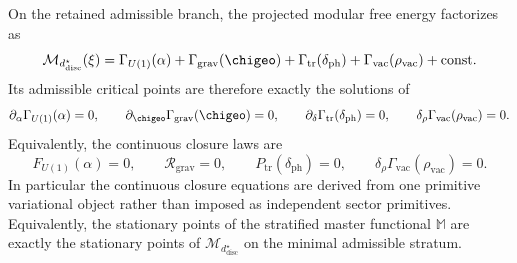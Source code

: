 
\begin{theorem}
\label{thm:continuous-closure-from-master-functional}
On the retained admissible branch, the projected modular free energy factorizes as
\[
\mathcal M_{d^\star_{\mathrm{disc}}}(\xi)
=
\Gamma_{U(1)}(\alpha)
+
\Gamma_{\mathrm{grav}}(\chigeo)
+
\Gamma_{\mathrm{tr}}(\delta_{\mathrm{ph}})
+
\Gamma_{\mathrm{vac}}(\rho_{\mathrm{vac}})
+\mathrm{const}.
\]
Its admissible critical points are therefore exactly the solutions of
\[
\partial_\alpha\Gamma_{U(1)}(\alpha)=0,
\qquad
\partial_{\chigeo}\Gamma_{\mathrm{grav}}(\chigeo)=0,
\qquad
\partial_\delta\Gamma_{\mathrm{tr}}(\delta_{\mathrm{ph}})=0,
\qquad
\delta_\rho\Gamma_{\mathrm{vac}}(\rho_{\mathrm{vac}})=0.
\]
Equivalently, the continuous closure laws are
\[
F_{U(1)}(\alpha)=0,
\qquad
\mathcal R_{\mathrm{grav}}=0,
\qquad
P_{\mathrm{tr}}(\delta_{\mathrm{ph}})=0,
\qquad
\delta_\rho\Gamma_{\mathrm{vac}}(\rho_{\mathrm{vac}})=0.
\]
In particular the continuous closure equations are derived from one primitive variational object
rather than imposed as independent sector primitives. Equivalently, the stationary points of the
stratified master functional $\mathbb M$ are exactly the stationary points of
$\mathcal M_{d^\star_{\mathrm{disc}}}$ on the minimal admissible stratum.
\end{theorem}

